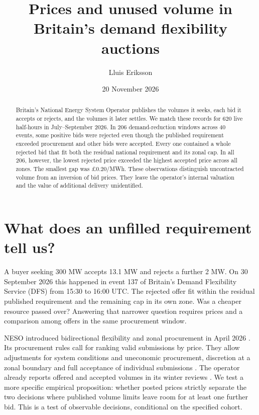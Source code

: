 \documentclass[11pt]{article}
\title{Prices and unused volume in Britain's demand flexibility auctions}
\author{Lluis Eriksson}
\date{20 November 2026}
\begin{document}
\maketitle
\begin{abstract}
Britain's National Energy System Operator publishes the volumes it seeks, each bid it accepts or rejects, and the volumes it later settles. We match these records for 620 live half-hours in July--September 2026. In 206 demand-reduction windows across 40 events, some positive bids were rejected even though the published requirement exceeded procurement and other bids were accepted. Every one contained a whole rejected bid that fit both the residual national requirement and its zonal cap. In all 206, however, the lowest rejected price exceeded the highest accepted price across all zones. The smallest gap was \pounds0.20/MWh. These observations distinguish uncontracted volume from an inversion of bid prices. They leave the operator's internal valuation and the value of additional delivery unidentified.
\end{abstract}

\section{What does an unfilled requirement tell us?}
A buyer seeking 300 MW accepts 13.1 MW and rejects a further 2 MW. On 30 September 2026 this happened in event 137 of Britain's Demand Flexibility Service (DFS) from 15:30 to 16:00 UTC. The rejected offer fit within the residual published requirement and the remaining cap in its own zone. Was a cheaper resource passed over? Answering that narrower question requires prices and a comparison among offers in the same procurement window.

NESO introduced bidirectional flexibility and zonal procurement in April 2026 \cite{service}. Its procurement rules call for ranking valid submissions by price. They allow adjustments for system conditions and uneconomic procurement, discretion at a zonal boundary and full acceptance of individual submissions \cite[pars.\ 12.2--12.4, 14.3--14.4]{rules}. The operator already reports offered and accepted volumes in its winter reviews \cite{winter}. We test a more specific empirical proposition: whether posted prices strictly separate the two decisions where published volume limits leave room for at least one further bid. This is a test of observable decisions, conditional on the specified cohort.
\end{document}
